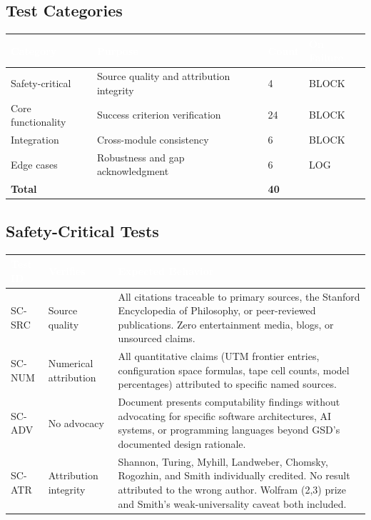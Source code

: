 \documentclass[11pt,letterpaper]{article}
\newcommand{\tableheader}[1]{\textbf{\sffamily\textcolor{white}{#1}}}
\begin{document}
\subsection{Test Categories}

\begin{center}
\begin{tabularx}{\textwidth}{L{3.5cm}XC{2cm}C{2.5cm}}
\toprule
{}
\tableheader{Category} & \tableheader{Purpose} & \tableheader{Count} & \tableheader{On Failure} \\
\midrule
Safety-critical & Source quality and attribution integrity & 4 & BLOCK \\
Core functionality & Success criterion verification & 24 & BLOCK \\
Integration & Cross-module consistency & 6 & BLOCK \\
Edge cases & Robustness and gap acknowledgment & 6 & LOG \\
\midrule
\textbf{Total} & & \textbf{40} & \\
\bottomrule
\end{tabularx}
\end{center}

\subsection{Safety-Critical Tests}

\begin{center}
\begin{tabularx}{\textwidth}{C{1.5cm}L{3.5cm}X}
\toprule
{}
\tableheader{Test ID} & \tableheader{Verifies} & \tableheader{Expected Behavior} \\
\midrule
SC-SRC & Source quality & All citations traceable to primary sources, the Stanford Encyclopedia of Philosophy, or peer-reviewed publications. Zero entertainment media, blogs, or unsourced claims. \\
SC-NUM & Numerical attribution & All quantitative claims (UTM frontier entries, configuration space formulas, tape cell counts, model percentages) attributed to specific named sources. \\
SC-ADV & No advocacy & Document presents computability findings without advocating for specific software architectures, AI systems, or programming languages beyond GSD's documented design rationale. \\
SC-ATR & Attribution integrity & Shannon, Turing, Myhill, Landweber, Chomsky, Rogozhin, and Smith individually credited. No result attributed to the wrong author. Wolfram (2,3) prize and Smith's weak-universality caveat both included. \\
\bottomrule
\end{tabularx}
\end{center}
\end{document}
